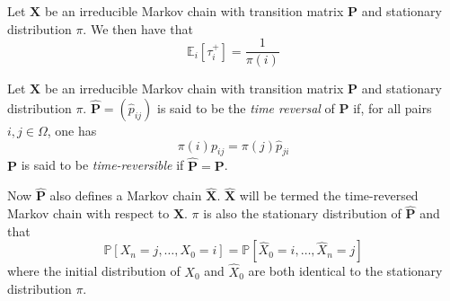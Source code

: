 \begin{proposition}
  \label{prop:2}
  Let $\mathbf{X}$ be an irreducible
  Markov chain with transition matrix $\mathbf{P}$ and stationary
  distribution $\pi$. We then have that
  \begin{equation}
    \label{eq:9}
    \mathbb{E}_{i}[\tau_i^{+}] = \frac{1}{\pi(i)}
  \end{equation}
\end{proposition}

\begin{definition}
  \label{def:9}
  Let $\mathbf{X}$ be an irreducible Markov chain with transition
  matrix $\mathbf{P}$ and stationary distribution
  $\pi$. $\hat{\mathbf{P}} = (\hat{p}_{ij})$ is said to be the {\em
    time reversal} of $\mathbf{P}$ if, for all pairs $i,j \in \Omega$,
  one has
  \begin{equation}
    \label{eq:16}
    \pi(i) p_{ij} = \pi(j) \hat{p}_{ji}
  \end{equation}
  $\mathbf{P}$ is said to be {\em time-reversible} if
  $\hat{\mathbf{P}} = \mathbf{P}$.
\end{definition}
Now $\hat{\mathbf{P}}$ also defines a Markov chain
$\hat{\mathbf{X}}$. $\hat{\mathbf{X}}$ will be termed the
time-reversed Markov chain with respect to $\mathbf{X}$. $\pi$ is also
the stationary distribution of $\hat{\mathbf{P}}$ and that
\begin{equation}
  \label{eq:17}
  \mathbb{P}[X_n = j, \dots, X_0 = i] = \mathbb{P}[\hat{X}_0 = i,
  \dots, \hat{X}_n = j] 
\end{equation}
where the initial distribution of $X_0$ and $\widehat{X}_0$ are both
identical to the stationary distribution $\pi$.
